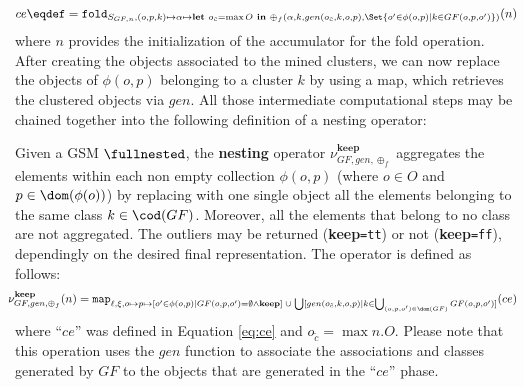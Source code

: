 \begin{equation}\label{eq:ce}
ce\eqdef=\texttt{fold}_{S_{GF,n},(o,p,k)\mapsto \alpha\mapsto\textbf{let }o_{\tilde{c}}=\max O\textbf{ in } \oplus_f(\alpha,k,gen(o_{\tilde{c}},k,o,p),\Set{o'\in\phi(o,p)|k\in GF(o,p,o')})}(n)
\end{equation}
where $n$ provides the initialization of the accumulator for the fold operation.
After creating the objects associated to the mined clusters, we can now replace the objects of $\phi(o,p)$ belonging to a cluster $k$ by using a map, which retrieves the clustered objects via $gen$. All those intermediate computational steps may be chained together into the following definition of a nesting operator:

\begin{definition}[Nesting]\label{def:semistructnest}
	Given a GSM $\fullnested$, the \textbf{nesting} operator $\nu_{GF,gen,\oplus_f}^{\textbf{keep}}$ aggregates the elements within each non empty collection $\phi(o,p)$ (where $o\in O$ and $p\in\dom(\phi(o))$) by replacing with one single object all the elements belonging to the same class $k\in \cod(GF)$. Moreover, all the elements that belong to no class are not aggregated. The outliers may be returned (\textbf{keep}\texttt{=tt}) or not (\textbf{keep}\texttt{=ff}), dependingly on the desired final representation. The operator is defined as follows:
	\[\hspace{-.25cm}\nu^{\textbf{keep}}_{GF,gen,\oplus_f}(n)=\texttt{map}_{\ell,\xi,o\mapsto p\mapsto [o'\in \phi(o,p)|GF(o,p,o')=\emptyset\wedge \textbf{keep}]\;\cup\;\bigcup[gen(o_{\tilde{c}},k,o,p)|k\in\bigcup_{(o,p,o')\in\dom(GF)} GF(o,p,o')]}(ce)\]
where ``$ce$'' was defined in Equation \vref{eq:ce} and $o_{\tilde{c}} = \max n.O$. Please note that this operation uses the $gen$ function to associate the associations and classes generated by $GF$ to the objects that are generated in the ``$ce$'' phase.
\end{definition}

